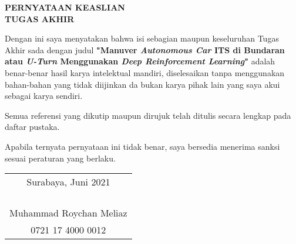 \begin{center}
  \large
  \textbf{PERNYATAAN KEASLIAN\\TUGAS AKHIR}
\end{center}

\thispagestyle{empty}

\vspace{2ex}


Dengan ini saya menyatakan bahwa isi sebagian maupun keseluruhan Tugas Akhir sada dengan judul \textbf{"Manuver \textit{Autonomous Car }ITS di Bundaran atau \textit{U-Turn }Menggunakan \textit{Deep Reinforcement Learning}"} adalah benar-benar hasil karya intelektual mandiri, diselesaikan tanpa menggunakan bahan-bahan yang tidak diijinkan da bukan karya pihak lain yang saya akui sebagai karya sendiri.

Semua referensi yang dikutip maupun dirujuk telah ditulis secara lengkap pada daftar pustaka.

Apabila ternyata pernyataan ini tidak benar, saya bersedia menerima sanksi sesuai peraturan yang berlaku.

\vspace{4ex}

\begin{flushright}
  \begin{tabular}[b]{c}
    Surabaya, Juni 2021\\
    \\
    \\
    \\
    \\
    Muhammad Roychan Meliaz\\
    0721 17 4000 0012
  \end{tabular}
\end{flushright}
